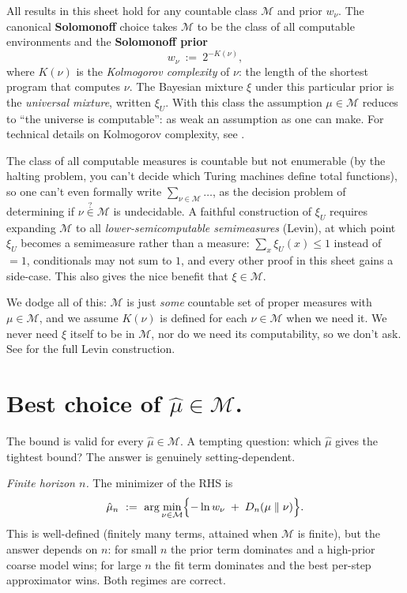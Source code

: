 \documentclass[fontsize=11pt, parskip=half]{scrartcl}
\newcommand{\Mc}{\mathcal{M}}
\begin{document}
All results in this sheet hold for any countable class $\Mc$ and prior $w_\nu$. The canonical \textbf{Solomonoff} choice takes $\Mc$ to be the class of all computable environments and the \textbf{Solomonoff prior}
\[
w_\nu ~:=~ 2^{-K(\nu)},
\]
where $K(\nu)$ is the \emph{Kolmogorov complexity} of $\nu$: the length of the shortest program that computes $\nu$. The Bayesian mixture $\xi$ under this particular prior is the \emph{universal mixture}, written $\xi_U$. With this class the assumption $\mu \in \Mc$ reduces to ``the universe is computable'': as weak an assumption as one can make. For technical details on Kolmogorov complexity, see \cite[\S2.7]{Hutter:24uaibook2}.

The class of all computable measures is countable but not enumerable (by the halting problem, you can't decide which Turing machines define total functions), so one can't even formally write
$\sum_{\nu \in \Mc} \ldots$, as the decision problem of determining if $\nu \overset{?}{\in} \Mc$ is undecidable. A faithful construction of $\xi_U$ requires expanding $\Mc$ to all \emph{lower-semicomputable semimeasures} (Levin), at which point $\xi_U$ becomes a semimeasure rather than a measure: $\sum_x \xi_U(x) \leq 1$ instead of $=1$, conditionals may not sum to $1$, and every other proof in this sheet gains a side-case. This also gives the nice benefit that $\xi \in \mathcal{M}$.

We dodge all of this: $\Mc$ is just \emph{some} countable set of proper measures with $\mu \in \Mc$, and we assume $K(\nu)$ is defined for each $\nu \in \Mc$ when we need it. We never need $\xi$ itself to be in $\Mc$, nor do we need its computability, so we don't ask. See \cite[\S2.4.3]{Hutter:04uaibook} for the full Levin construction.


\section{Best choice of $\hat{\mu} \in \Mc$.}\label{app:best_choice_mu}

The bound is valid for every $\hat\mu \in \Mc$. A tempting question: which
$\hat\mu$ gives the tightest bound? The answer is genuinely setting-dependent.

\textit{Finite horizon $n$.} The minimizer of the RHS is
\[
    \hat\mu_n ~:=~ \arg\min_{\nu \in \Mc}\Bigl\{ -\ln w_\nu \;+\; D_n(\mu \parallel \nu) \Bigr\}.
\]
This is well-defined (finitely many terms, attained when $\Mc$ is finite),
but the answer depends on $n$: for small $n$ the prior term dominates and a
high-prior coarse model wins; for large $n$ the fit term dominates and the best
per-step approximator wins. Both regimes are correct.
\end{document}
